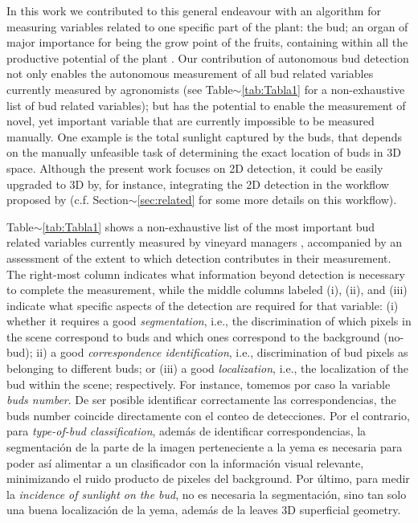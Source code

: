 \documentclass[a4paper,authoryear,review]{elsarticle}
\begin{document}
%
In this work we contributed to this general endeavour with an algorithm for measuring variables related to one specific part of the plant: the bud; an organ of major importance for being the grow point of the fruits, containing within all the productive potential of the plant \citep{may2000bud}. Our contribution of  autonomous bud detection not only enables the autonomous measurement of all bud related variables currently measured by agronomists (see Table$\sim$\ref{tab:Tabla1} for a non-exhaustive list of bud related variables); but has the potential to enable the measurement of novel, yet important variable  that are currently impossible to be measured manually. One example is the total sunlight captured by the buds, that depends on the manually unfeasible task of determining the exact location of buds in 3D space.  Although the present work focuses on 2D detection, it could be easily upgraded to 3D by, for instance, integrating the 2D detection in the workflow proposed by \cite{diaz2018grapevine} (c.f. Section$\sim$\ref{sec:related} for some more details on this workflow).

%
Table$\sim$\ref{tab:Tabla1} shows a non-exhaustive list of the most important bud related variables currently measured by vineyard managers \citep{sanchez2005bud, noyce2016basis, collins2020effects}, accompanied by an assessment of the extent to which detection contributes in their measurement. The right-most column indicates what information beyond detection  is necessary to complete the measurement, while the middle columns labeled (i), (ii), and (iii) indicate what specific aspects of the detection are required for that variable: (i) whether it requires a good  \emph{segmentation}, i.e., the discrimination of which pixels in the scene correspond to buds and which ones correspond to the background (no-bud); ii) a good \emph{correspondence identification}, i.e., discrimination of bud pixels as belonging to different buds; or (iii) a good \emph{localization}, i.e., the localization of the bud within the scene; respectively.
%
For instance, tomemos por caso la variable \emph{buds number}. De ser posible identificar correctamente las correspondencias, the buds number coincide directamente con el conteo de detecciones. Por el contrario, para \emph{type-of-bud classification}, además de identificar correspondencias, la segmentación de la parte de la imagen perteneciente a la yema es necesaria para poder así alimentar a un clasificador con la información visual relevante, minimizando el ruido producto de pixeles del background. Por último, para medir la \emph{incidence of sunlight on the bud}, no es necesaria la segmentación, sino tan solo una buena localización de la yema, además de la leaves 3D superficial geometry.
\end{document}
